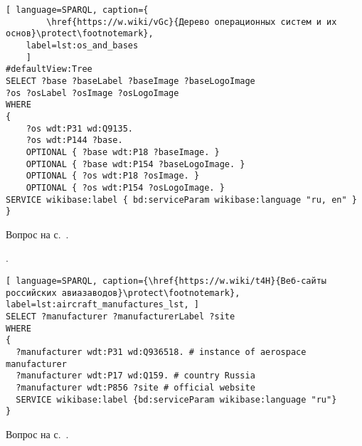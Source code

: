 \begin{task}
\label{answer:os_and_bases}

\begin{lstlisting}[ language=SPARQL, caption={
		\href{https://w.wiki/vGc}{Дерево операционных систем и их основ}\protect\footnotemark},
	label=lst:os_and_bases
	]
#defaultView:Tree
SELECT ?base ?baseLabel ?baseImage ?baseLogoImage
?os ?osLabel ?osImage ?osLogoImage
WHERE
{
	?os wdt:P31 wd:Q9135.
	?os wdt:P144 ?base.
	OPTIONAL { ?base wdt:P18 ?baseImage. }
	OPTIONAL { ?base wdt:P154 ?baseLogoImage. }
	OPTIONAL { ?os wdt:P18 ?osImage. }
	OPTIONAL { ?os wdt:P154 ?osLogoImage. }
SERVICE wikibase:label { bd:serviceParam wikibase:language "ru, en" }
}
\end{lstlisting}

\small{Вопрос на с.~\pageref{tasks:operating_system_tasks}.}
\end{task}


\begin{task}
    \label{answer:aircraft_manufacturers}
    . 
    
	\begin{lstlisting}[ language=SPARQL, caption={\href{https://w.wiki/t4H}{Веб-сайты российских авиазаводов}\protect\footnotemark}, label=lst:aircraft_manufactures_lst, ]
SELECT ?manufacturer ?manufacturerLabel ?site
WHERE
{
  ?manufacturer wdt:P31 wd:Q936518. # instance of aerospace manufacturer
  ?manufacturer wdt:P17 wd:Q159. # country Russia
  ?manufacturer wdt:P856 ?site # official website
  SERVICE wikibase:label {bd:serviceParam wikibase:language "ru"}
}
\end{lstlisting}
    
    \small{Вопрос на с.~\pageref{lst:lang2}.}
\end{task}

